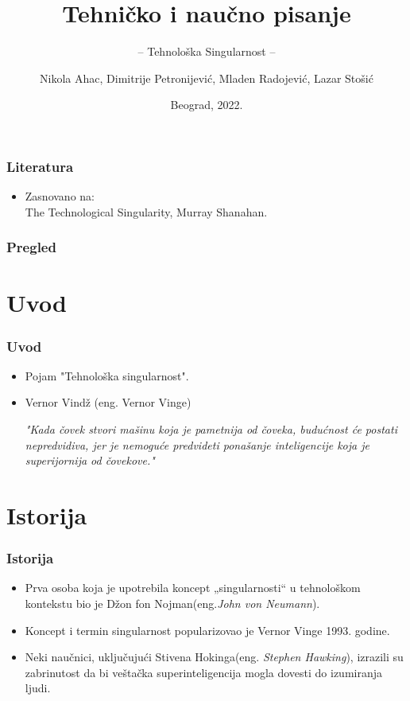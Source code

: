 \documentclass{beamer}
\title{Tehničko i naučno pisanje}
\subtitle{-- Tehnološka Singularnost --}
\author{Nikola Ahac, Dimitrije Petronijević, Mladen Radojević, Lazar Stošić}
\institute{Matematički fakultet\\Univerzitet u Beogradu}
\date{
	\footnotesize{Beograd, 2022.}	
}
\begin{document}
\begin{frame}
	\thispagestyle{empty}
	\titlepage
\end{frame}

\addtocounter{framenumber}{-1}

\begin{frame}[fragile]\frametitle{Literatura}
	\begin{itemize}
		\item Zasnovano na:\\
		The Technological Singularity, Murray Shanahan.
	\end{itemize}
\end{frame}

\begin{frame}
	\frametitle{Pregled} %
	\tableofcontents[hidesubsections] 
\end{frame}
\section{Uvod}

\begin{frame}[fragile]\frametitle{Uvod}
	\begin{itemize}	
		\item Pojam "Tehnološka singularnost".
		\item Vernor Vindž (eng. Vernor Vinge)
              
              \textit {"Kada čovek stvori mašinu koja je pametnija od čoveka, budućnost će postati nepredvidiva, jer je nemoguće predvideti ponašanje inteligencije koja je superijornija od čovekove."}

	\end{itemize}
\end{frame}

\section{Istorija}
\begin{frame}[fragile]\frametitle{Istorija}
    \begin{itemize}	
        \item Prva osoba koja je upotrebila koncept „singularnosti“ u tehnološkom kontekstu bio je Džon fon Nojman(eng.\textit{John von Neumann}).
        \item Koncept i termin singularnost popularizovao je Vernor Vinge 1993. godine.
	 \item Neki naučnici, uključujući Stivena Hokinga(eng. \textit{Stephen Hawking}), izrazili su zabrinutost da bi veštačka superinteligencija mogla dovesti do izumiranja ljudi.
    \end{itemize}
\end{frame}
\end{document}
